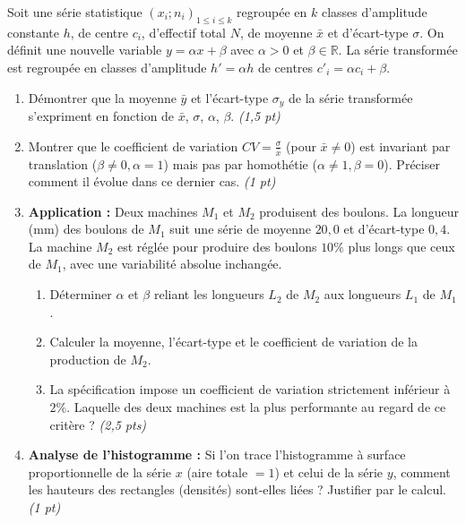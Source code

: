 \documentclass[11pt]{article}
\begin{document}
\begin{exercice}
Soit une série statistique $(x_i; n_i)_{1 \le i \le k}$ regroupée en $k$ classes d'amplitude constante $h$, de centre $c_i$, d'effectif total $N$, de moyenne $\bar{x}$ et d'écart-type $\sigma$.
On définit une nouvelle variable $y = \alpha x + \beta$ avec $\alpha > 0$ et $\beta \in \mathbb{R}$. La série transformée est regroupée en classes d'amplitude $h' = \alpha h$ de centres $c'_i = \alpha c_i + \beta$.

\begin{enumerate}
    \item Démontrer que la moyenne $\bar{y}$ et l'écart-type $\sigma_y$ de la série transformée s'expriment en fonction de $\bar{x}$, $\sigma$, $\alpha$, $\beta$. \textit{(1,5 pt)}
    \item Montrer que le coefficient de variation $CV = \frac{\sigma}{\bar{x}}$ (pour $\bar{x} \neq 0$) est invariant par translation ($\beta \neq 0, \alpha=1$) mais pas par homothétie ($\alpha \neq 1, \beta=0$). Préciser comment il évolue dans ce dernier cas. \textit{(1 pt)}
    \item \textbf{Application :} Deux machines $M_1$ et $M_2$ produisent des boulons. La longueur (mm) des boulons de $M_1$ suit une série de moyenne $20,0$ et d'écart-type $0,4$. La machine $M_2$ est réglée pour produire des boulons $10\%$ plus longs que ceux de $M_1$, avec une variabilité absolue inchangée.
    \begin{enumerate}
        \item Déterminer $\alpha$ et $\beta$ reliant les longueurs $L_2$ de $M_2$ aux longueurs $L_1$ de $M_1$.
        \item Calculer la moyenne, l'écart-type et le coefficient de variation de la production de $M_2$.
        \item La spécification impose un coefficient de variation strictement inférieur à $2\%$. Laquelle des deux machines est la plus performante au regard de ce critère ? \textit{(2,5 pts)}
    \end{enumerate}
    \item \textbf{Analyse de l'histogramme :} Si l'on trace l'histogramme à surface proportionnelle de la série $x$ (aire totale $=1$) et celui de la série $y$, comment les hauteurs des rectangles (densités) sont-elles liées ? Justifier par le calcul. \textit{(1 pt)}
\end{enumerate}
\end{exercice}
\end{document}
